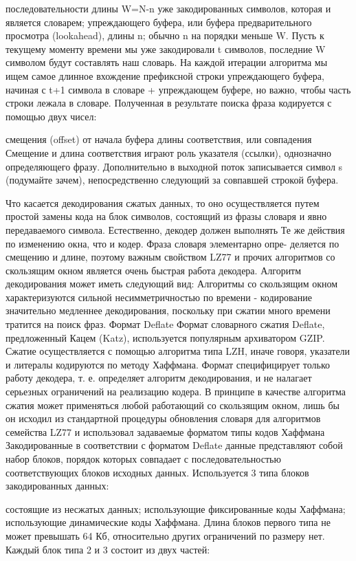 \documentclass[12pt]{article}
\begin{document}
последовательности длины W=N-n уже закодированных символов, которая и является словарем;
упреждающего буфера, или буфера предварительного просмотра (lookahead), длины n; обычно n на порядки меньше W.
Пусть к текущему моменту времени мы уже закодировали t символов, последние W символом будут составлять наш словарь. На каждой итерации алгоритма мы ищем самое длинное вхождение префиксной строки упреждающего буфера, начиная с t+1 символа в словаре + упреждающем буфере, но важно, чтобы часть строки лежала в словаре. Полученная в результате поиска фраза кодируется с помощью двух чисел:


смещения (offset) от начала буфера
длины соответствия, или совпадения
Смещение и длина соответствия играют роль указателя (ссылки), однозначно определяющего фразу. Дополнительно в выходной поток записывается символ s (подумайте зачем), непосредственно следующий за совпавшей строкой буфера.

Что касается декодирования сжатых данных, то оно осуществляется путем простой замены кода на блок символов, состоящий из фразы словаря и явно передаваемого символа. Естественно, декодер должен выполнять Те же действия по изменению окна, что и кодер. Фраза словаря элементарно опре- деляется по смещению и длине, поэтому важным свойством LZ77 и прочих алгоритмов со скользящим окном является очень быстрая работа декодера.
Алгоритм декодирования может иметь следующий вид:
Алгоритмы со скользящим окном характеризуются сильной несимметричностью по времени - кодирование значительно медленнее декодирования, поскольку при сжатии много времени тратится на поиск фраз.
Формат Deflate
Формат словарного сжатия Deflate, предложенный Кацем (Katz), используется популярным архиватором GZIP. Сжатие осуществляется с помощью алгоритма типа LZH, иначе говоря, указатели и литералы кодируются по методу Хаффмана. Формат специфицирует только работу декодера, т. е. определяет алгоритм декодирования, и не налагает серьезных ограничений на реализацию кодера. В принципе в качестве алгоритма сжатия может применяться любой работающий со скользящим окном, лишь бы он исходил из стандартной процедуры обновления словаря для алгоритмов семейства LZ77 и использовал задаваемые форматом типы кодов Хаффмана
Закодированные в соответствии с форматом Deflate данные представляют собой набор блоков, порядок которых совпадает с последовательностью соответствующих блоков исходных данных. Используется 3 типа блоков закодированных данных:

состоящие из несжатых данных;
использующие фиксированные коды Хаффмана;
использующие динамические коды Хаффмана.
Длина блоков первого типа не может превышать 64 Кб, относительно других ограничений по размеру нет. Каждый блок типа 2 и 3 состоит из двух частей:
\end{document}
